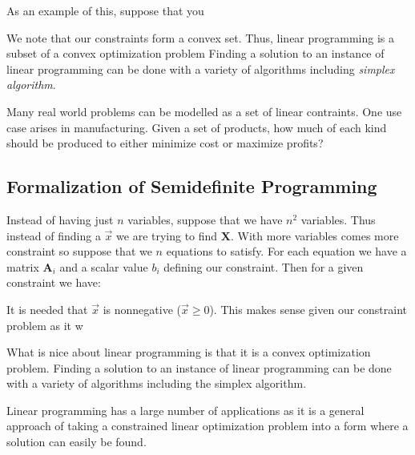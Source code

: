 \documentclass{article}
\begin{document}
As an example of this, suppose that you

We note that our constraints form a convex set.
Thus, linear programming is a subset of a convex optimization problem
Finding a solution to an instance of linear programming can be done with a variety of algorithms 
including \emph{simplex algorithm}. 

Many real world problems can be modelled as a set of linear contraints. One use case arises in manufacturing.
Given a set of products, how much of each kind should be produced to either minimize cost or maximize profits?


\subsection{Formalization of Semidefinite Programming}
Instead of having just \( n \) variables, suppose that we have \( n^2 \) variables. Thus instead of finding a \( \vec{x} \) we are trying to find \( \mathbf{X} \). With more variables comes more constraint so suppose that we \( n \) equations to satisfy. For each equation we have a matrix \( \mathbf{A}_i \) and a scalar value \( b_i \) defining our constraint. Then for a given constraint we have:

It is needed that \( \vec{x} \) is nonnegative (\( \vec{x} \geq 0 \)). This makes sense given our constraint problem as it w

What is nice about linear programming is that it is a convex optimization problem. Finding a solution to an instance of linear programming can be done with a variety of algorithms including the simplex algorithm.

Linear programming has a large number of applications as it is a general approach of taking a constrained linear optimization problem into a form where a solution can easily be found.

\end{document}
